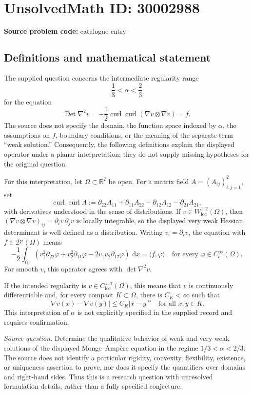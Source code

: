 \documentclass[11pt]{article}
\newcommand{\R}{\mathbb{R}}
\newcommand{\dd}{\,\mathrm{d}}
\begin{document}
\section*{UnsolvedMath ID: 30002988}
\textbf{Source problem code:} catalogue entry
\subsection{Definitions and mathematical statement}
The supplied question concerns the intermediate regularity range
\[
\frac13<\alpha<\frac23
\]
for the equation
\[
\operatorname{Det}\nabla^2v
=-\frac12\operatorname{curl}\operatorname{curl}(\nabla v\otimes\nabla v)=f.
\]
The source does not specify the domain, the function space indexed by \(\alpha\), the assumptions on \(f\), boundary conditions, or the meaning of the separate term ``weak solution.'' Consequently, the following definitions explain the displayed operator under a planar interpretation; they do not supply missing hypotheses for the original question.

For this interpretation, let \(\Omega\subset\R^2\) be open. For a matrix field \(A=(A_{ij})_{i,j=1}^2\), set
\[
\operatorname{curl}\operatorname{curl}A
:=\partial_{22}A_{11}+\partial_{11}A_{22}
-\partial_{12}A_{12}-\partial_{21}A_{21},
\]
with derivatives understood in the sense of distributions. If \(v\in W^{1,2}_{\mathrm{loc}}(\Omega)\), then \((\nabla v\otimes\nabla v)_{ij}=\partial_i v\,\partial_j v\) is locally integrable, so the displayed very weak Hessian determinant is well defined as a distribution. Writing \(v_i=\partial_i v\), the equation with \(f\in\mathcal D'(\Omega)\) means
\[
-\frac12\int_\Omega
\left(v_1^2\partial_{22}\varphi
+v_2^2\partial_{11}\varphi
-2v_1v_2\partial_{12}\varphi\right)\,\dd x
=\langle f,\varphi\rangle
\quad\text{for every }\varphi\in C_c^\infty(\Omega).
\]
For smooth \(v\), this operator agrees with \(\det\nabla^2v\).

If the intended regularity is \(v\in C^{1,\alpha}_{\mathrm{loc}}(\Omega)\), this means that \(v\) is continuously differentiable and, for every compact \(K\subset\Omega\), there is \(C_K<\infty\) such that
\[
|\nabla v(x)-\nabla v(y)|\le C_K|x-y|^\alpha
\quad\text{for all }x,y\in K.
\]
This interpretation of \(\alpha\) is not explicitly specified in the supplied record and requires confirmation.

\emph{Source question.} Determine the qualitative behavior of weak and very weak solutions of the displayed Monge--Amp\`ere equation in the regime \(1/3<\alpha<2/3\). The source does not identify a particular rigidity, convexity, flexibility, existence, or uniqueness assertion to prove, nor does it specify the quantifiers over domains and right-hand sides. Thus this is a research question with unresolved formulation details, rather than a fully specified conjecture.
\end{document}
